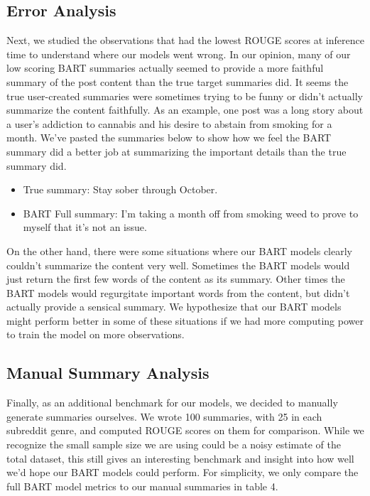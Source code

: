 \documentclass[11pt,a4paper, twocolumn]{article}
\begin{document}
\subsection{Error Analysis}

Next, we studied the observations that had the lowest ROUGE scores at inference time to understand where our models went wrong. 
In our opinion, many of our low scoring BART summaries actually seemed to provide a more faithful summary of the post content than the true target summaries did. 
It seems the true user-created summaries were sometimes trying to be funny or didn't actually summarize the content faithfully. 
As an example, one post was a long story about a user's addiction to cannabis and his desire to abstain from smoking for a month. 
We've pasted the summaries below to show how we feel the BART summary did a better job at summarizing the important details than the true summary did. 

\begin{itemize}
  \item True summary: Stay sober through October.
  \item BART Full summary: I'm taking a month off from smoking weed to prove to myself that it's not an issue.
\end{itemize}

On the other hand, there were some situations where our BART models clearly couldn't summarize the content very well. 
Sometimes the BART models would just return the first few words of the content as its summary. 
Other times the BART models would regurgitate important words from the content, but didn't actually provide a sensical summary. 
We hypothesize that our BART models might perform better in some of these situations if we had more computing power to train the model on more observations. 

\subsection{Manual Summary Analysis}

Finally, as an additional benchmark for our models, we decided to manually generate summaries ourselves. 
We wrote 100 summaries, with 25 in each subreddit genre, and computed ROUGE scores on them for comparison. 
While we recognize the small sample size we are using could be a noisy estimate of the total dataset, 
this still gives an interesting benchmark and insight into how well we'd hope our BART models could perform.
For simplicity, we only compare the full BART model metrics to our manual summaries in table 4. 
\end{document}
